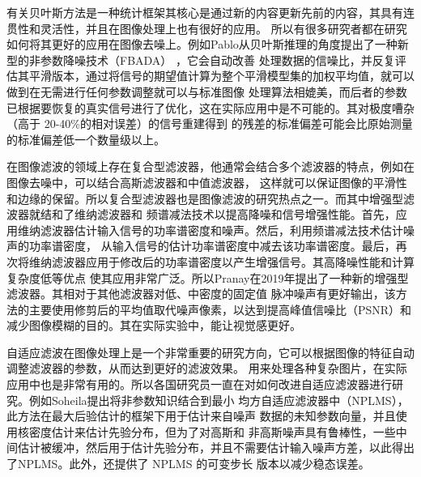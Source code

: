 有关贝叶斯方法是一种统计框架其核心是通过新的内容更新先前的内容，其具有连贯性和灵活性，并且在图像处理上也有很好的应用。
所以有很多研究者都在研究如何将其更好的应用在图像去噪上。例如Pablo从贝叶斯推理的角度提出了一种新型的非参数降噪技术（FBADA）
\cite{sanchez-alarconFullyAdaptiveBayesian2022}，它会自动改善
处理数据的信噪比，并反复评估其平滑版本，通过将信号的期望值计算为整个平滑模型集的加权平均值，就可以做到在无需进行任何参数调整就可以与标准图像
处理算法相媲美，而后者的参数已根据要恢复的真实信号进行了优化，这在实际应用中是不可能的。其对极度嘈杂（高于 20-40\%的相对误差）的信号重建得到
的残差的标准偏差可能会比原始测量的标准偏差低一个数量级以上。

在图像滤波的领域上存在复合型滤波器，他通常会结合多个滤波器的特点，例如在图像去噪中，可以结合高斯滤波器和中值滤波器，
这样就可以保证图像的平滑性和边缘的保留。所以复合型滤波器也是图像滤波的研究热点之一。而其中增强型滤波器就结和了维纳滤波器和
频谱减法技术以提高降噪和信号增强性能。首先，应用维纳滤波器估计输入信号的功率谱密度和噪声。然后，利用频谱减法技术估计噪声的功率谱密度，
从输入信号的估计功率谱密度中减去该功率谱密度。最后，再次将维纳滤波器应用于修改后的功率谱密度以产生增强信号。其高降噪性能和计算复杂度低等优点
使其应用非常广泛。所以Pranay在2019年提出了一种新的增强型滤波器\cite{kumarImageDeNoisingSalt2019}。其相对于其他滤波器对低、中密度的固定值
脉冲噪声有更好输出，该方法的主要使用修剪后的平均值取代噪声像素，以达到提高峰值信噪比（PSNR）和减少图像模糊的目的。其在实际实验中，能让视觉感更好。

自适应滤波在图像处理上是一个非常重要的研究方向，它可以根据图像的特征自动调整滤波器的参数，从而达到更好的滤波效果。
用来处理各种复杂图片，在实际应用中也是非常有用的。所以各国研究员一直在对如何改进自适应滤波器进行研究。例如Soheila提出将非参数知识结合到最小
均方自适应滤波器中（NPLMS）\cite{ashkezari-toussiIncorporatingNonparametricKnowledge2019}，此方法在最大后验估计的框架下用于估计来自噪声
数据的未知参数向量，并且使用核密度估计来估计先验分布，但为了对高斯和
非高斯噪声具有鲁棒性，一些中间估计被缓冲，然后用于估计先验分布，并且不需要估计输入噪声方差，以此得出了NPLMS。此外，还提供了 NPLMS 的可变步长
版本以减少稳态误差。




